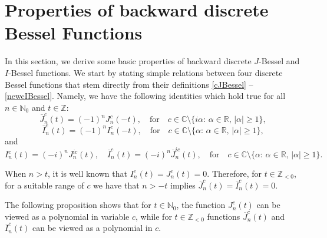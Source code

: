 \documentclass[12pt]{amsart}
\numberwithin{equation}{section}
\begin{document}
\vspace{1.5cc}
\section{Properties of backward discrete Bessel Functions}
\label{sec. Properties}

In this section, we derive some basic properties of backward discrete $J$-Bessel and $I$-Bessel functions. We start by stating simple relations between four discrete Bessel functions that stem directly from their definitions \eqref{cJBessel} -- \eqref{newcIBessel}. Namely, we have the following identities which hold true for all $n\in\mathbb{N}_0$ and $t\in\mathbb{Z}$:
$$
\overline{J}_{n}^{c}\left( t\right)=(-1)^n J_n^c(-t), \quad \text{for}\quad c\in \mathbb{C}\setminus\{i\alpha:\, \alpha\in \mathbb{R},\, |\alpha|\geq 1\},
$$
$$
\overline{I}_{n}^{c}\left( t\right)=(-1)^n I_n^c(-t), \quad \text{for} \quad c\in \mathbb{C}\setminus\{\alpha:\, \alpha\in \mathbb{R},\, |\alpha|\geq 1\},
$$
and
$$
I_{n}^{c}\left( t\right)=(-i)^n J_n^{ic}(t), \quad  \overline{I}_{n}^{c}\left( t\right)=(-i)^n\overline{J}_{n}^{ic}\left( t\right),  \quad \text{for} \quad c\in \mathbb{C}\setminus\{\alpha:\, \alpha\in \mathbb{R},\, |\alpha|\geq 1\}.
$$

When $n>t$, it is well known that $I_n^c(t)=J_n^c(t)=0$. Therefore, for $t\in\mathbb{Z}_{<0}$, for a suitable range of $c$ we have that $n>-t$ implies $\overline{J}_{n}^{c}\left( t\right)= \overline{I}_{n}^{c}\left( t\right)=0$.

The following proposition shows that for $t\in\mathbb{N}_0$, the function $J_{n}^{c}\left( t\right) $ can be viewed as a polynomial in variable $c$, while for $t\in\mathbb{Z}_{<0}$  functions $\overline{J}_{n}^{c}\left( t\right)$  and $\overline{I}_{n}^{c}\left( t\right)$ can be viewed as a polynomial in $c$.
\end{document}
